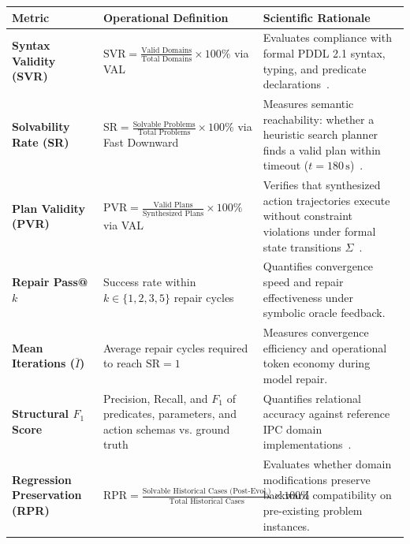 \documentclass[10pt,a4paper]{article}
\begin{document}
\begin{table}[h!]
\centering
\footnotesize
\begin{tabularx}{\textwidth}{l p{4.7cm} X}
\toprule
\textbf{Metric} & \textbf{Operational Definition} & \textbf{Scientific Rationale} \\
\midrule
\textbf{Syntax Validity (SVR)} & $\text{SVR} = \frac{\text{Valid Domains}}{\text{Total Domains}} \times 100\%$ via VAL & Evaluates compliance with formal PDDL 2.1 syntax, typing, and predicate declarations~\cite{fox2003pddl21,howey2004val}. \\
\addlinespace[0.15ex]
\textbf{Solvability Rate (SR)} & $\text{SR} = \frac{\text{Solvable Problems}}{\text{Total Problems}} \times 100\%$ via Fast Downward & Measures semantic reachability: whether a heuristic search planner finds a valid plan within timeout ($t = 180\,\text{s}$)~\cite{helmert2006fast}. \\
\addlinespace[0.15ex]
\textbf{Plan Validity (PVR)} & $\text{PVR} = \frac{\text{Valid Plans}}{\text{Synthesized Plans}} \times 100\%$ via VAL & Verifies that synthesized action trajectories execute without constraint violations under formal state transitions $\Sigma$~\cite{ghallab2004automated,howey2004val}. \\
\addlinespace[0.15ex]
\textbf{Repair Pass@$k$} & Success rate within $k \in \{1, 2, 3, 5\}$ repair cycles & Quantifies convergence speed and repair effectiveness under symbolic oracle feedback. \\
\addlinespace[0.15ex]
\textbf{Mean Iterations ($\bar{I}$)} & Average repair cycles required to reach $\text{SR} = 1$ & Measures convergence efficiency and operational token economy during model repair. \\
\addlinespace[0.15ex]
\textbf{Structural $F_1$ Score} & Precision, Recall, and $F_1$ of predicates, parameters, and action schemas vs. ground truth & Quantifies relational accuracy against reference IPC domain implementations~\cite{bavandpour2026llmonly}. \\
\addlinespace[0.15ex]
\textbf{Regression Preservation (RPR)} & $\text{RPR} = \frac{\text{Solvable Historical Cases (Post-Evol.)}}{\text{Total Historical Cases}} \times 100\%$ & Evaluates whether domain modifications preserve backward compatibility on pre-existing problem instances. \\
\bottomrule
\end{tabularx}
\end{table}

\vspace{-0.4em}
\end{document}
